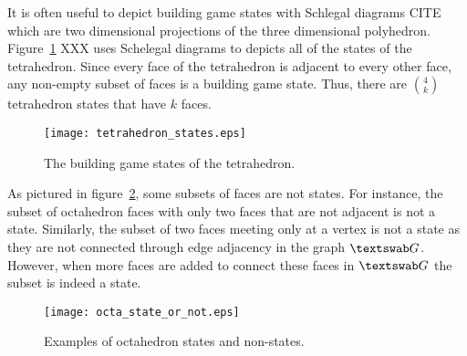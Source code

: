 It is often useful to depict building game states with Schlegal diagrams CITE which are two dimensional projections of the three dimensional polyhedron. Figure~\ref{fig:TetraStates} XXX uses Schelegal diagrams to depicts all of the states of the tetrahedron. Since every face of the tetrahedron is adjacent to every other face, any non-empty subset of faces is a building game state. Thus, there are ${4 \choose k}$ tetrahedron states that have $k$ faces. 
\begin{figure}[ht]
  \texttt{[image: tetrahedron\_states.eps]}
\caption{The building game states of the tetrahedron.}
\label{fig:TetraStates}
\end{figure}
As pictured in figure~\ref{fig:OctaStates}, some subsets of faces are not states. For instance, the subset of octahedron faces with only two faces that are not adjacent is not a state. Similarly, the subset of two faces meeting only at a vertex is not a state as they are not connected through edge adjacency in the graph $\PolyGraph$. However, when more faces are added to connect these faces in $\PolyGraph$ the subset is indeed a state.

\begin{figure}[ht]
  \texttt{[image: octa\_state\_or\_not.eps]}
\caption{Examples of octahedron states and non-states.}
\label{fig:OctaStates}
\end{figure}
 


 



